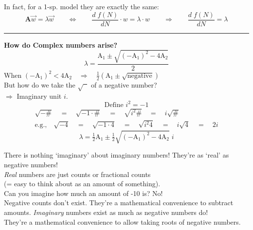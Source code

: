 \documentclass{article}
\newcommand{\ind}{\-\hspace{1cm}}
\begin{document}
In fact, for a 1-sp. model they are exactly the same:\\
\begin{equation*}
	\mathbf{A} \vec{w} = \lambda \vec{w} \qquad \Leftrightarrow \qquad \frac{d \; f(N)}{d N} \cdot  w  = \lambda \cdot w \qquad \Rightarrow \qquad \frac{d \; f(N)}{d N} = \lambda
\end{equation*}

\rule[0.5ex]{\linewidth}{1pt}

\textbf{How do Complex numbers arise?}\\
\begin{equation*}
	\lambda = \frac{\text{A}_1 \pm \sqrt{(-\text{A}_1)^2 - 4\text{A}_2}}{2}
\end{equation*}
When $(-\text{A}_1)^2 < 4 \text{A}_2  \quad \Rightarrow \quad \tfrac{1}{2}(\text{A}_1\pm \sqrt{\text{negative}})$\\
But how do we take the $\sqrt{\phantom{x}}$ of a negative number?\\
\ind $\Rightarrow$ Imaginary unit $i$.
\begin{equation*}
	\boxed{\text{Define }i^2 = -1}
\end{equation*}
\begin{align*}
	\sqrt{-\#} \quad = \quad \sqrt{-1 \cdot \#} \quad = \quad \sqrt{i^2\#} \quad = \quad i \sqrt{\#}\\
	\text{e.g.,} \quad	\sqrt{-4} \quad = \quad \sqrt{-1 \cdot 4} \quad = \quad \sqrt{i^2 4} \quad = \quad i \sqrt{4} \quad = \quad 2i
\end{align*}
\begin{equation*}
	\lambda = \tfrac{1}{2}\text{A}_1 \pm \tfrac{1}{2}\sqrt{(-\text{A}_1)^2 - 4\text{A}_2} \; i
\end{equation*}

There is nothing `imaginary' about imaginary numbers!  They're as `real' as negative numbers!\\
\ind \emph{Real} numbers are just counts or fractional counts \\
\ind \ind (= easy to think about as an amount of something).\\
\ind \ind Can you imagine how much an amount of -10 is?  No!\\
\ind \ind Negative counts don't exist.  They're a mathematical convenience to subtract amounts.
\ind \emph{Imaginary} numbers exist as much as negative numbers do! \\
\ind \ind They're a mathematical convenience to allow taking roots of negative numbers.\\
\end{document}
